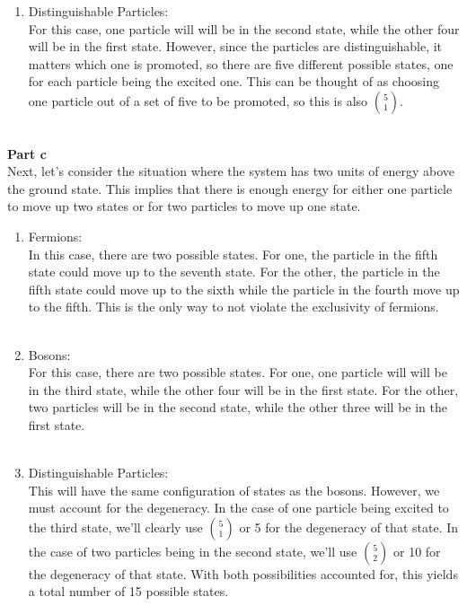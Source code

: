 \documentclass[12pt]{article}
\begin{document}
\begin{flushleft}
\begin{enumerate}
    \item Distinguishable Particles:\\
    For this case, one particle will will be in the second state, while the other four will be in the first state.
    However, since the particles are distinguishable, it matters which one is promoted, so there are five different possible states, one for each particle being the excited one.
    This can be thought of as choosing one particle out of a set of five to be promoted, so this is also $5\choose1$.\\~\\

\end{enumerate}

\textbf{Part c}\\
Next, let's consider the situation where the system has two units of energy above the ground state.
This implies that there is enough energy for either one particle to move up two states or for two particles to move up one state.
\begin{enumerate}

    \item Fermions:\\
    In this case, there are two possible states.
    For one, the particle in the fifth state could move up to the seventh state.
    For the other, the particle in the fifth state could move up to the sixth while the particle in the fourth move up to the fifth.
    This is the only way to not violate the exclusivity of fermions.\\~\\

    \item Bosons:\\
    For this case, there are two possible states.
    For one, one particle will will be in the third state, while the other four will be in the first state.
    For the other, two particles will be in the second state, while the other three will be in the first state.\\~\\

    \item Distinguishable Particles:\\
    This will have the same configuration of states as the bosons.
    However, we must account for the degeneracy.
    In the case of one particle being excited to the third state, we'll clearly use $5\choose1$ or 5 for the degeneracy of that state.
    In the case of two particles being in the second state, we'll use $5\choose2$ or 10 for the degeneracy of that state.
    With both possibilities accounted for, this yields a total number of 15 possible states.


\end{enumerate}
\end{flushleft}
\end{document}
